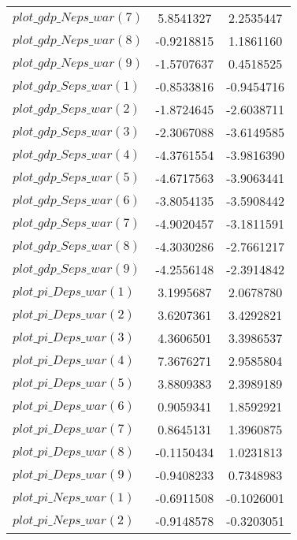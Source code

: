 \begin{center}
\begin{longtable}{lcc}
$plot\_gdp\_N eps\_war (7)  $	 & 	      5.8541327	 & 	      2.2535447 \\ 
$plot\_gdp\_N eps\_war (8)  $	 & 	     -0.9218815	 & 	      1.1861160 \\ 
$plot\_gdp\_N eps\_war (9)  $	 & 	     -1.5707637	 & 	      0.4518525 \\ 
$plot\_gdp\_S eps\_war (1)  $	 & 	     -0.8533816	 & 	     -0.9454716 \\ 
$plot\_gdp\_S eps\_war (2)  $	 & 	     -1.8724645	 & 	     -2.6038711 \\ 
$plot\_gdp\_S eps\_war (3)  $	 & 	     -2.3067088	 & 	     -3.6149585 \\ 
$plot\_gdp\_S eps\_war (4)  $	 & 	     -4.3761554	 & 	     -3.9816390 \\ 
$plot\_gdp\_S eps\_war (5)  $	 & 	     -4.6717563	 & 	     -3.9063441 \\ 
$plot\_gdp\_S eps\_war (6)  $	 & 	     -3.8054135	 & 	     -3.5908442 \\ 
$plot\_gdp\_S eps\_war (7)  $	 & 	     -4.9020457	 & 	     -3.1811591 \\ 
$plot\_gdp\_S eps\_war (8)  $	 & 	     -4.3030286	 & 	     -2.7661217 \\ 
$plot\_gdp\_S eps\_war (9)  $	 & 	     -4.2556148	 & 	     -2.3914842 \\ 
$plot\_pi\_D eps\_war (1)   $	 & 	      3.1995687	 & 	      2.0678780 \\ 
$plot\_pi\_D eps\_war (2)   $	 & 	      3.6207361	 & 	      3.4292821 \\ 
$plot\_pi\_D eps\_war (3)   $	 & 	      4.3606501	 & 	      3.3986537 \\ 
$plot\_pi\_D eps\_war (4)   $	 & 	      7.3676271	 & 	      2.9585804 \\ 
$plot\_pi\_D eps\_war (5)   $	 & 	      3.8809383	 & 	      2.3989189 \\ 
$plot\_pi\_D eps\_war (6)   $	 & 	      0.9059341	 & 	      1.8592921 \\ 
$plot\_pi\_D eps\_war (7)   $	 & 	      0.8645131	 & 	      1.3960875 \\ 
$plot\_pi\_D eps\_war (8)   $	 & 	     -0.1150434	 & 	      1.0231813 \\ 
$plot\_pi\_D eps\_war (9)   $	 & 	     -0.9408233	 & 	      0.7348983 \\ 
$plot\_pi\_N eps\_war (1)   $	 & 	     -0.6911508	 & 	     -0.1026001 \\ 
$plot\_pi\_N eps\_war (2)   $	 & 	     -0.9148578	 & 	     -0.3203051 \\ 

\end{longtable}
\end{center}
